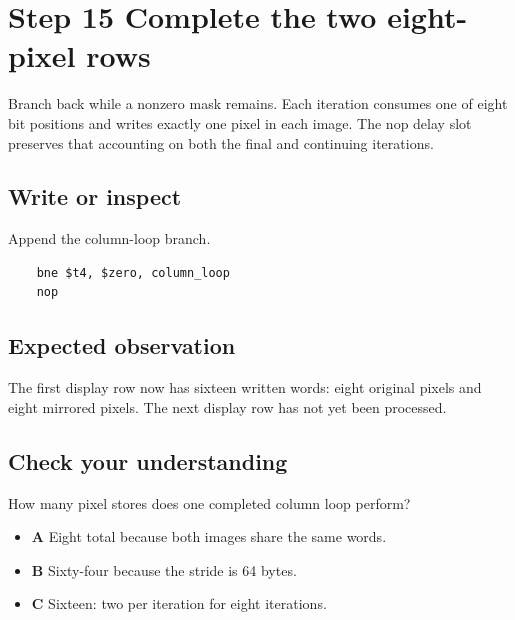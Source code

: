 \section{Step 15 Complete the two eight-pixel
  rows}\label{003-eight-byte-sprite-s15-step-15-complete-the-two-eight-pixel-rows}

Branch back while a nonzero mask remains. Each iteration consumes one of
eight bit positions and writes exactly one pixel in each image. The nop
delay slot preserves that accounting on both the final and continuing
iterations.

\subsection{Write or
  inspect}\label{003-eight-byte-sprite-s15-write-or-inspect}

Append the column-loop branch.

\begin{verbatim}
    bne $t4, $zero, column_loop
    nop
\end{verbatim}

\subsection{Expected
  observation}\label{003-eight-byte-sprite-s15-expected-observation}

The first display row now has sixteen written words: eight original
pixels and eight mirrored pixels. The next display row has not yet been
processed.

\subsection{Check your
  understanding}\label{003-eight-byte-sprite-s15-check-your-understanding}

How many pixel stores does one completed column loop perform?

\begin{itemize}
  \tightlist
  \item
        \textbf{A} Eight total because both images share the same words.
  \item
        \textbf{B} Sixty-four because the stride is 64 bytes.
  \item
        \textbf{C} Sixteen: two per iteration for eight iterations.
\end{itemize}
